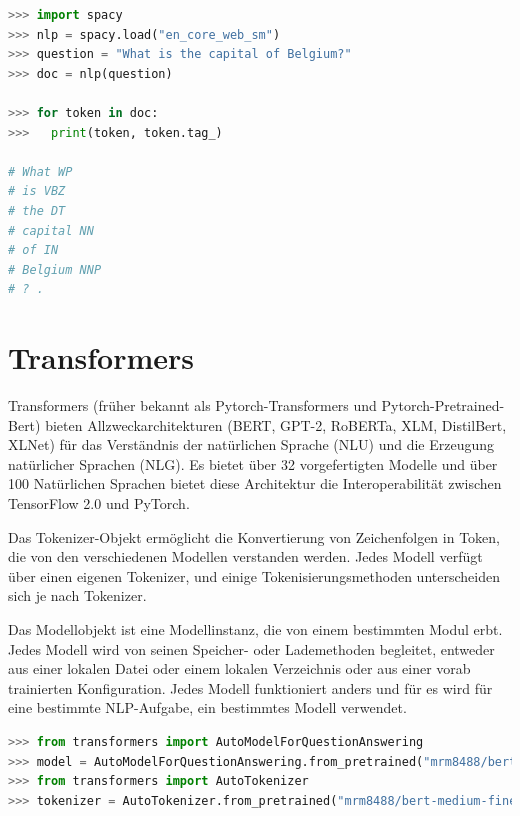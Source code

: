 \documentclass[
        ngerman,
        paper=a4,
        numbers=noendperiod,
]{scrreprt}
\begin{document}
\begin{lstlisting}[language=Python, caption=Spacy Beispiel]
>>> import spacy
>>> nlp = spacy.load("en_core_web_sm")
>>> question = "What is the capital of Belgium?"
>>> doc = nlp(question)

>>> for token in doc:
>>>   print(token, token.tag_)

# What WP                                    
# is VBZ                                     
# the DT                                     
# capital NN            
# of IN
# Belgium NNP
# ? .

\end{lstlisting}

\section{Transformers}
Transformers (früher bekannt als Pytorch-Transformers und Pytorch-Pretrained-Bert) bieten Allzweckarchitekturen (BERT, GPT-2, RoBERTa, XLM, DistilBert, XLNet) für das Verständnis der natürlichen Sprache (NLU) und die Erzeugung natürlicher Sprachen (NLG). Es bietet über 32 vorgefertigten Modelle und über 100 Natürlichen Sprachen bietet diese Architektur die Interoperabilität zwischen TensorFlow 2.0 und PyTorch.

Das Tokenizer-Objekt ermöglicht die Konvertierung von Zeichenfolgen in Token, die von den verschiedenen Modellen verstanden werden. Jedes Modell verfügt über einen eigenen Tokenizer, und einige Tokenisierungsmethoden unterscheiden sich je nach Tokenizer.

Das Modellobjekt ist eine Modellinstanz, die von einem bestimmten Modul erbt. Jedes Modell wird von seinen Speicher- oder Lademethoden begleitet, entweder aus einer lokalen Datei oder einem lokalen Verzeichnis oder aus einer vorab trainierten Konfiguration. Jedes Modell funktioniert anders und für es wird für eine bestimmte NLP-Aufgabe, ein bestimmtes Modell verwendet\citep{TransformersDocumentation}\citep{PyTorch-TransformersPyTorch}.

\begin{lstlisting}[language=Python, caption=Transformers Beispiel]
>>> from transformers import AutoModelForQuestionAnswering
>>> model = AutoModelForQuestionAnswering.from_pretrained("mrm8488/bert-medium-finetuned-squadv2")
>>> from transformers import AutoTokenizer
>>> tokenizer = AutoTokenizer.from_pretrained("mrm8488/bert-medium-finetuned-squadv2")
\end{lstlisting}
\end{document}

